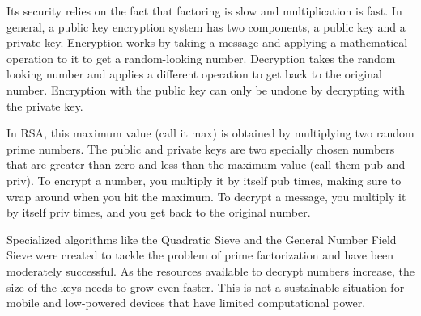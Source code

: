 Its security relies on the fact that factoring is slow and multiplication is fast. In general, a public key encryption system has two components, a public key and a private key. Encryption works by taking a message and applying a mathematical operation to it to get a random-looking number. Decryption takes the random looking number and applies a different operation to get back to the original number. Encryption with the public key can only be undone by decrypting with the private key.

In RSA, this maximum value (call it max) is obtained by multiplying two random prime numbers. The public and private keys are two specially chosen numbers that are greater than zero and less than the maximum value (call them pub and priv). To encrypt a number, you multiply it by itself pub times, making sure to wrap around when you hit the maximum. To decrypt a message, you multiply it by itself priv times, and you get back to the original number.

Specialized algorithms like the Quadratic Sieve and the General Number Field Sieve were created to tackle the problem of prime factorization and have been moderately successful. As the resources available to decrypt numbers increase, the size of the keys needs to grow even faster. This is not a sustainable situation for mobile and low-powered devices that have limited computational power.